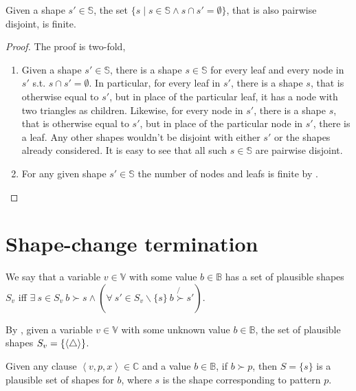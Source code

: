 \begin{theorem}\label{lemma:extend-finite-converse} Given a shape
$s'\in\mathbb{S}$, the set $\{s \mid s\in\mathbb{S} \wedge s\cap
s'=\emptyset\}$, that is also pairwise disjoint, is finite.\end{theorem}

\begin{proof} The proof is two-fold,

\begin{enumerate}

\item Given a shape $s'\in\mathbb{S}$, there is a shape $s\in\mathbb{S}$ for
every leaf and every node in $s'$ s.t. $s\cap s'=\emptyset$. In particular, for
every leaf in $s'$, there is a shape $s$, that is otherwise equal to $s'$, but
in place of the particular leaf, it has a node with two triangles as children.
Likewise, for every node in $s'$, there is a shape $s$, that is otherwise equal
to $s'$, but in place of the particular node in $s'$, there is a leaf. Any
other shapes wouldn't be disjoint with either $s'$ or the shapes already
considered. It is easy to see that all such $s\in\mathbb{S}$ are pairwise
disjoint.

\item For any given shape $s'\in\mathbb{S}$ the number of nodes and leafs is
finite by .\end{enumerate}\end{proof} 

\section{Shape-change termination}

\begin{definition} We say that a variable $v\in\mathbb{V}$ with some value
$b\in\mathbb{B}$ has a set of plausible shapes $S_v$ iff $\exists\ s\in S_v\
b\succ s \wedge \left( \forall\ s'\in S_v\backslash\{s\}\ b \not{\succ} s'
\right)$.\end{definition}

\begin{corollary} By , given a variable
$v\in\mathbb{V}$ with some unknown value $b\in\mathbb{B}$, the set of plausible
shapes $S_v=\{\left\langle\bigtriangleup\right\rangle\}$.\end{corollary}

\begin{corollary} Given any clause $\left\langle v,p,x
\right\rangle\in\mathbb{C}$ and a value $b\in\mathbb{B}$, if $b\succ p$, then
$S=\{s\}$ is a plausible set of shapes for $b$, where $s$ is the shape
corresponding to pattern $p$.\end{corollary}

